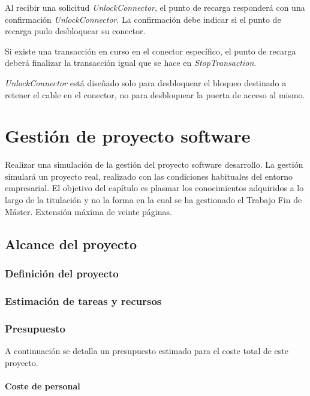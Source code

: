 \documentclass[12pt,a4paper,onecolumn,oneside]{report}
\begin{document}
Al recibir una solicitud \textit{UnlockConnector}, el punto de recarga responderá con una confirmación \textit{UnlockConnector}. La confirmación debe indicar si el punto de recarga pudo desbloquear su conector. 

Si existe una transacción en curso en el conector específico, el punto de recarga deberá finalizar la transacción igual que se hace en \textit{StopTransaction}.

\textit{UnlockConnector} está diseñado solo para desbloquear el bloqueo destinado a retener el cable en el conector, no para desbloquear la puerta de acceso al mismo.




\chapter{Gestión de proyecto software}
\label{Gestión de proyecto software}

Realizar una simulación de la gestión del proyecto software desarrollo. La gestión simulará un proyecto real, realizado con las condiciones habituales del entorno empresarial. El objetivo del capítulo es plasmar los conocimientos adquiridos a lo largo de la titulación y no la forma en la cual se ha gestionado el Trabajo Fin de Máster. Extensión máxima de veinte páginas.

\section{Alcance del proyecto}
\label{Alcance del proyecto}

\subsection{Definición del proyecto}


\subsection{Estimación de tareas y recursos}



\subsection{Presupuesto}

A continuación se detalla un presupuesto estimado para el coste total de este proyecto.

\subsubsection{Coste de personal}
\end{document}
